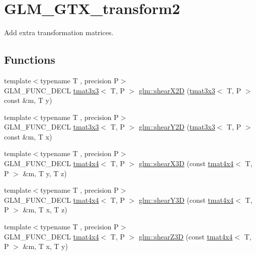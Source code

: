 \hypertarget{group__gtx__transform2}{}\section{G\+L\+M\+\_\+\+G\+T\+X\+\_\+transform2}
\label{group__gtx__transform2}


Add extra transformation matrices.  


\subsection*{Functions}
\begin{DoxyCompactItemize}
\item 
{\footnotesize template$<$typename T , precision P$>$ }\\G\+L\+M\+\_\+\+F\+U\+N\+C\+\_\+\+D\+E\+CL \hyperlink{structglm_1_1tmat3x3}{tmat3x3}$<$ T, P $>$ \hyperlink{group__gtx__transform2_ga10f6c62d8f827c4cacedb71fd05e4ba2}{glm\+::shear\+X2D} (\hyperlink{structglm_1_1tmat3x3}{tmat3x3}$<$ T, P $>$ const \&m, T y)
\item 
{\footnotesize template$<$typename T , precision P$>$ }\\G\+L\+M\+\_\+\+F\+U\+N\+C\+\_\+\+D\+E\+CL \hyperlink{structglm_1_1tmat3x3}{tmat3x3}$<$ T, P $>$ \hyperlink{group__gtx__transform2_ga21ade82859e09a5cdaf4a01fbf8dc61b}{glm\+::shear\+Y2D} (\hyperlink{structglm_1_1tmat3x3}{tmat3x3}$<$ T, P $>$ const \&m, T x)
\item 
{\footnotesize template$<$typename T , precision P$>$ }\\G\+L\+M\+\_\+\+F\+U\+N\+C\+\_\+\+D\+E\+CL \hyperlink{structglm_1_1tmat4x4}{tmat4x4}$<$ T, P $>$ \hyperlink{group__gtx__transform2_gae06ce274e4754f925d5d68440e89452e}{glm\+::shear\+X3D} (const \hyperlink{structglm_1_1tmat4x4}{tmat4x4}$<$ T, P $>$ \&m, T y, T z)
\item 
{\footnotesize template$<$typename T , precision P$>$ }\\G\+L\+M\+\_\+\+F\+U\+N\+C\+\_\+\+D\+E\+CL \hyperlink{structglm_1_1tmat4x4}{tmat4x4}$<$ T, P $>$ \hyperlink{group__gtx__transform2_ga31253ea18fdcdfde08c134c8b67688f7}{glm\+::shear\+Y3D} (const \hyperlink{structglm_1_1tmat4x4}{tmat4x4}$<$ T, P $>$ \&m, T x, T z)
\item 
{\footnotesize template$<$typename T , precision P$>$ }\\G\+L\+M\+\_\+\+F\+U\+N\+C\+\_\+\+D\+E\+CL \hyperlink{structglm_1_1tmat4x4}{tmat4x4}$<$ T, P $>$ \hyperlink{group__gtx__transform2_ga5558ac64a7144685bf2eb4483a0e2f51}{glm\+::shear\+Z3D} (const \hyperlink{structglm_1_1tmat4x4}{tmat4x4}$<$ T, P $>$ \&m, T x, T y)

\end{DoxyCompactItemize}
